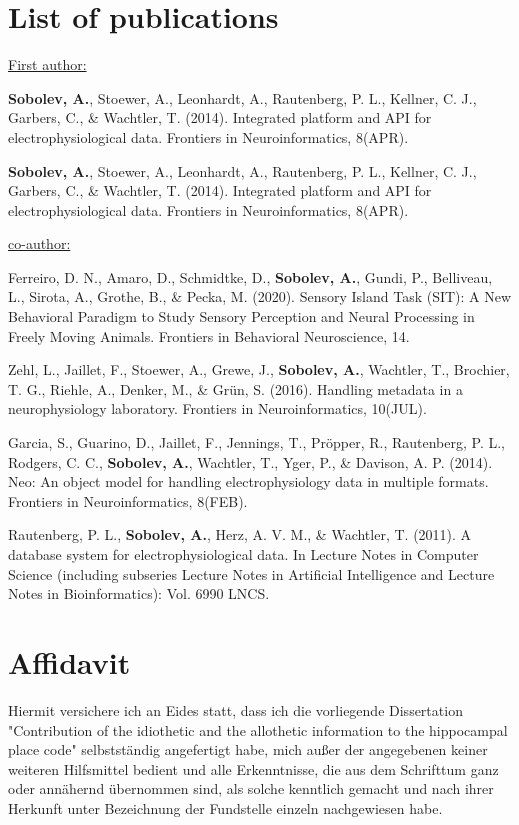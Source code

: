 \chapter{List of publications}

\underline{First author:}

\textbf{Sobolev, A.}, Stoewer, A., Leonhardt, A., Rautenberg, P. L., Kellner, C. J., Garbers, C., \& Wachtler, T. (2014). Integrated platform and API for electrophysiological data. Frontiers in Neuroinformatics, 8(APR).

\textbf{Sobolev, A.}, Stoewer, A., Leonhardt, A., Rautenberg, P. L., Kellner, C. J., Garbers, C., \& Wachtler, T. (2014). Integrated platform and API for electrophysiological data. Frontiers in Neuroinformatics, 8(APR).

\underline{co-author:}

Ferreiro, D. N., Amaro, D., Schmidtke, D., \textbf{Sobolev, A.}, Gundi, P., Belliveau, L., Sirota, A., Grothe, B., \& Pecka, M. (2020). Sensory Island Task (SIT): A New Behavioral Paradigm to Study Sensory Perception and Neural Processing in Freely Moving Animals. Frontiers in Behavioral Neuroscience, 14.

Zehl, L., Jaillet, F., Stoewer, A., Grewe, J., \textbf{Sobolev, A.}, Wachtler, T., Brochier, T. G., Riehle, A., Denker, M., \& Grün, S. (2016). Handling metadata in a neurophysiology laboratory. Frontiers in Neuroinformatics, 10(JUL).

Garcia, S., Guarino, D., Jaillet, F., Jennings, T., Pröpper, R., Rautenberg, P. L., Rodgers, C. C., \textbf{Sobolev, A.}, Wachtler, T., Yger, P., \& Davison, A. P. (2014). Neo: An object model for handling electrophysiology data in multiple formats. Frontiers in Neuroinformatics, 8(FEB).

Rautenberg, P. L., \textbf{Sobolev, A.}, Herz, A. V. M., \& Wachtler, T. (2011). A database system for electrophysiological data. In Lecture Notes in Computer Science (including subseries Lecture Notes in Artificial Intelligence and Lecture Notes in Bioinformatics): Vol. 6990 LNCS.



\chapter{Affidavit}
Hiermit versichere ich an Eides statt, dass ich die vorliegende Dissertation "Contribution of the idiothetic and the allothetic information to the hippocampal place code" selbstständig angefertigt habe, mich außer der angegebenen keiner weiteren Hilfsmittel bedient und alle Erkenntnisse, die aus dem Schrifttum ganz oder annähernd übernommen sind, als solche kenntlich gemacht und nach ihrer Herkunft unter Bezeichnung der Fundstelle einzeln nachgewiesen habe.

